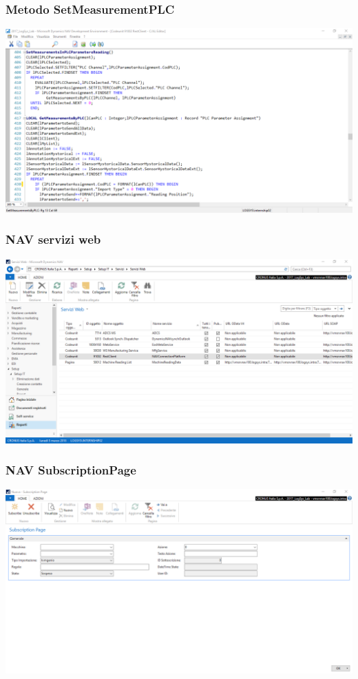 \documentclass{beamer}
\begin{document}
\begin{frame}
\frametitle{Metodo SetMeasurementPLC}
\includegraphics[width=1\textwidth]{images/NAVSetMesurament.png}
\end{frame}


\begin{frame}
\frametitle{NAV servizi web}
\includegraphics[width=1\textwidth]{images/NAVServiziWeb.png}
\end{frame}


\begin{frame}
\frametitle{NAV SubscriptionPage}
\includegraphics[width=1\textwidth]{images/NAVSubscriptionPage.png}
\end{frame}
\end{document}
